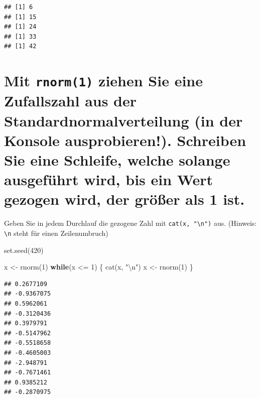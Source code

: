 \documentclass[12pt,a4paper]{article}
\newenvironment{Shaded}{\begin{snugshade}}{\end{snugshade}}
\newcommand{\ControlFlowTok}[1]{\textcolor[rgb]{0.13,0.29,0.53}{\textbf{#1}}}
\newcommand{\DecValTok}[1]{\textcolor[rgb]{0.00,0.00,0.81}{#1}}
\newcommand{\FunctionTok}[1]{\textcolor[rgb]{0.00,0.00,0.00}{#1}}
\newcommand{\NormalTok}[1]{#1}
\newcommand{\OtherTok}[1]{\textcolor[rgb]{0.56,0.35,0.01}{#1}}
\newcommand{\SpecialCharTok}[1]{\textcolor[rgb]{0.00,0.00,0.00}{#1}}
\newcommand{\StringTok}[1]{\textcolor[rgb]{0.31,0.60,0.02}{#1}}
\begin{document}
\begin{verbatim}
## [1] 6
## [1] 15
## [1] 24
## [1] 33
## [1] 42
\end{verbatim}

\hypertarget{mit-ziehen-sie-eine-zufallszahl-aus-der-standardnormalverteilung-in-der-konsole-ausprobieren.-schreiben-sie-eine-schleife-welche-solange-ausgefuxfchrt-wird-bis-ein-wert-gezogen-wird-der-gruxf6uxdfer-als-1-ist.}{%
\section{\texorpdfstring{Mit \texttt{rnorm(1)} ziehen Sie eine
Zufallszahl aus der Standardnormalverteilung (in der Konsole
ausprobieren!). Schreiben Sie eine Schleife, welche solange ausgeführt
wird, bis ein Wert gezogen wird, der größer als 1
ist.}{Mit  ziehen Sie eine Zufallszahl aus der Standardnormalverteilung (in der Konsole ausprobieren!). Schreiben Sie eine Schleife, welche solange ausgeführt wird, bis ein Wert gezogen wird, der größer als 1 ist.}}\label{mit-ziehen-sie-eine-zufallszahl-aus-der-standardnormalverteilung-in-der-konsole-ausprobieren.-schreiben-sie-eine-schleife-welche-solange-ausgefuxfchrt-wird-bis-ein-wert-gezogen-wird-der-gruxf6uxdfer-als-1-ist.}}

Geben Sie in jedem Durchlauf die gezogene Zahl mit
\texttt{cat(x,\ "\textbackslash{}n")} aus. (Hinweis:
\texttt{\textbackslash{}n} steht für einen Zeilenumbruch)

\begin{Shaded}
\begin{Highlighting}[]
    \FunctionTok{set.seed}\NormalTok{(}\DecValTok{420}\NormalTok{)}
    
\NormalTok{    x }\OtherTok{\textless{}{-}} \FunctionTok{rnorm}\NormalTok{(}\DecValTok{1}\NormalTok{)}
    \ControlFlowTok{while}\NormalTok{(x }\SpecialCharTok{\textless{}=} \DecValTok{1}\NormalTok{) \{}
      \FunctionTok{cat}\NormalTok{(x, }\StringTok{"}\SpecialCharTok{\textbackslash{}n}\StringTok{"}\NormalTok{)}
\NormalTok{      x }\OtherTok{\textless{}{-}} \FunctionTok{rnorm}\NormalTok{(}\DecValTok{1}\NormalTok{)}
\NormalTok{    \}}
\end{Highlighting}
\end{Shaded}

\begin{verbatim}
## 0.2677109 
## -0.9367075 
## 0.5962061 
## -0.3120436 
## 0.3979791 
## -0.5147962 
## -0.5518658 
## -0.4605003 
## -2.948791 
## -0.7671461 
## 0.9385212 
## -0.2870975
\end{verbatim}
\end{document}
